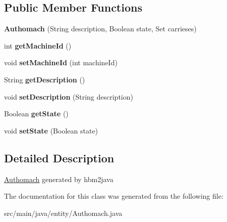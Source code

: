 \subsection*{Public Member Functions}
\begin{DoxyCompactItemize}
\item 
\mbox{\label{classentity_1_1_authomach_a8f9bf217f1a51601009ce0da96571cf2}} 
{\bfseries Authomach} (String description, Boolean state, Set carrieses)
\item 
\mbox{\label{classentity_1_1_authomach_aa123815d3d8c471756c298edba10d4e1}} 
int {\bfseries get\+Machine\+Id} ()
\item 
\mbox{\label{classentity_1_1_authomach_aa7eb52c9c1828f6870b84727cb2fd7d9}} 
void {\bfseries set\+Machine\+Id} (int machine\+Id)
\item 
\mbox{\label{classentity_1_1_authomach_ac935bc6cd52b576e53a3f58c6bb1eb1e}} 
String {\bfseries get\+Description} ()
\item 
\mbox{\label{classentity_1_1_authomach_ab49dd6d37693e9b4a32e881aae5ec898}} 
void {\bfseries set\+Description} (String description)
\item 
\mbox{\label{classentity_1_1_authomach_a6c2b7c4d9aeb91c62791854f9f472b89}} 
Boolean {\bfseries get\+State} ()
\item 
\mbox{\label{classentity_1_1_authomach_a7efa67cff55a9d3678745f918a26d7c8}} 
void {\bfseries set\+State} (Boolean state)
\end{DoxyCompactItemize}


\subsection{Detailed Description}
\mbox{\hyperlink{classentity_1_1_authomach}{Authomach}} generated by hbm2java 

The documentation for this class was generated from the following file\+:\begin{DoxyCompactItemize}
\item 
src/main/java/entity/Authomach.\+java\end{DoxyCompactItemize}
